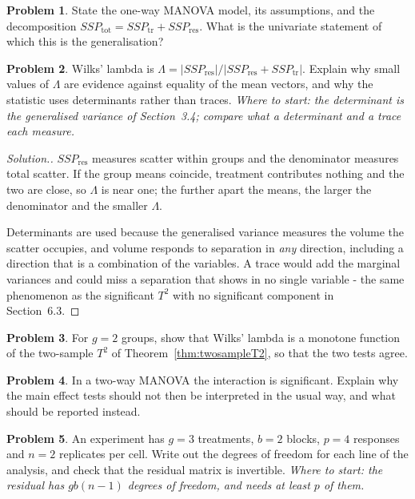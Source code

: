 \documentclass[11pt,a4paper]{article}
\theoremstyle{definition}
\newtheorem{problemx}{Problem}[section]
\newenvironment{problem}{\begin{problemx}}{\end{problemx}}
\newenvironment{solution}
  {\renewcommand{\qedsymbol}{}\begin{proof}[\textit{Solution}.]}
  {\end{proof}}
\begin{document}
\begin{problem}
State the one-way MANOVA model, its assumptions, and the decomposition
$SSP_{\text{tot}} = SSP_{\text{tr}} + SSP_{\text{res}}$. What is the univariate
statement of which this is the generalisation?
\end{problem}

\begin{problem}
Wilks' lambda is
$\Lambda = \left|SSP_{\text{res}}\right|/\left|SSP_{\text{res}}+SSP_{\text{tr}}\right|$.
Explain why small values of $\Lambda$ are evidence against equality of the mean
vectors, and why the statistic uses determinants rather than traces.
\emph{Where to start: the determinant is the generalised variance of
Section~3.4; compare what a determinant and a trace each measure.}
\end{problem}

\begin{solution}
$SSP_{\text{res}}$ measures scatter within groups and the denominator measures
total scatter. If the group means coincide, treatment contributes nothing and
the two are close, so $\Lambda$ is near one; the further apart the means, the
larger the denominator and the smaller $\Lambda$.

Determinants are used because the generalised variance measures the volume the
scatter occupies, and volume responds to separation in \emph{any} direction,
including a direction that is a combination of the variables. A trace would add
the marginal variances and could miss a separation that shows in no single
variable - the same phenomenon as the significant $T^{2}$ with no significant
component in Section~6.3.
\end{solution}

\begin{problem}
For $g=2$ groups, show that Wilks' lambda is a monotone function of the
two-sample $T^{2}$ of Theorem~\ref{thm:twosampleT2}, so that the two tests
agree.
\end{problem}

\begin{problem}
In a two-way MANOVA the interaction is significant. Explain why the main effect
tests should not then be interpreted in the usual way, and what should be
reported instead.
\end{problem}

\begin{problem}
An experiment has $g=3$ treatments, $b=2$ blocks, $p=4$ responses and $n=2$
replicates per cell. Write out the degrees of freedom for each line of the
analysis, and check that the residual matrix is invertible.
\emph{Where to start: the residual has $gb(n-1)$ degrees of freedom, and needs
at least $p$ of them.}
\end{problem}
\end{document}

